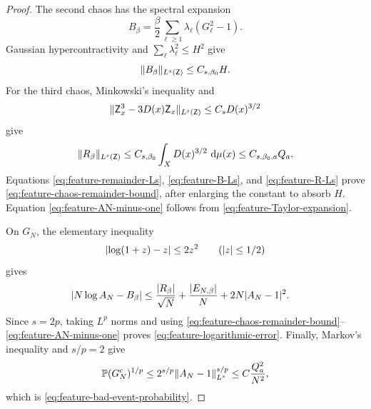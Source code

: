 \documentclass[11pt,reqno]{amsart}
\numberwithin{equation}{section}
\theoremstyle{plain}
\theoremstyle{definition}
\DeclarePairedDelimiter{\abs}{\lvert}{\rvert}
\DeclarePairedDelimiter{\norm}{\lVert}{\rVert}
\newcommand{\dd}{\mathop{}\!\mathrm d}
\newcommand{\Pb}{\mathbb P}
\newcommand{\be}{\beta}
\begin{document}
\begin{proof}
The second chaos has the spectral expansion
\begin{equation}
 B_{\be}
 =\frac\be2\sum_{\ell\geq1}\lambda_\ell(G_\ell^2-1).
 \label{eq:feature-B-spectral-expansion}
\end{equation}
Gaussian hypercontractivity and $\sum_\ell\lambda_\ell^2\leq H^2$ give
\begin{equation}
 \norm{B_{\be}}_{L^s(\mathsf Z)}\leq C_{s,\be_0}H.
 \label{eq:feature-B-Ls}
\end{equation}
For the third chaos, Minkowski's inequality and
\begin{equation}
 \norm{\mathsf Z_x^3-3D(x)\mathsf Z_x}_{L^s(\mathsf Z)}
 \leq C_sD(x)^{3/2}
 \label{eq:feature-cubic-gaussian-moment}
\end{equation}
give
\begin{equation}
 \norm{R_{\be}}_{L^s(\mathsf Z)}
 \leq C_{s,\be_0}\int_XD(x)^{3/2}\,\dd\mu(x)
 \leq C_{s,\be_0,a}Q_a.
 \label{eq:feature-R-Ls}
\end{equation}
Equations \eqref{eq:feature-remainder-Ls}, \eqref{eq:feature-B-Ls}, and \eqref{eq:feature-R-Ls} prove \eqref{eq:feature-chaos-remainder-bound}, after enlarging the constant to absorb $H$.  Equation \eqref{eq:feature-AN-minus-one} follows from \eqref{eq:feature-Taylor-expansion}.

On $G_N$, the elementary inequality
\begin{equation}
 \abs{\log(1+z)-z}\leq2z^2
 \qquad(\abs z\leq1/2)
 \label{eq:feature-logarithm-remainder}
\end{equation}
gives
\begin{align}
 \abs{N\log A_N-B_{\be}}
 &\leq\frac{\abs{R_{\be}}}{\sqrt N}
 +\frac{\abs{E_{N,\be}}}{N}
 +2N\abs{A_N-1}^2.
 \label{eq:feature-logarithm-pointwise}
\end{align}
Since $s=2p$, taking $L^p$ norms and using \eqref{eq:feature-chaos-remainder-bound}--\eqref{eq:feature-AN-minus-one} proves \eqref{eq:feature-logarithmic-error}.  Finally, Markov's inequality and $s/p=2$ give
\begin{equation}
 \Pb(G_N^c)^{1/p}
 \leq2^{s/p}\norm{A_N-1}_{L^s}^{s/p}
 \leq C\frac{Q_a^2}{N^2},
 \label{eq:feature-bad-event-Markov}
\end{equation}
which is \eqref{eq:feature-bad-event-probability}.
\end{proof}
\end{document}
